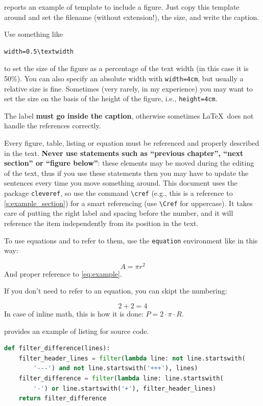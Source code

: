  reports an example of template to include a figure.
Just copy this template around and set the filename (without extension!), the size, and write the caption.

Use something like

\begin{verbatim}
width=0.5\textwidth
\end{verbatim}

to set the size of the figure as a percentage of the text width (in this case it is 50\%).
You can also specify an absolute width with \texttt{width=4cm}, but usually a relative size is fine.
Sometimes (very rarely, in my experience) you may want to set the size on the basis of the height of the figure, i.e., \texttt{height=4cm}.

The label \textbf{must go inside the caption}, otherwise sometimes \LaTeX\ does not handle the references correctly.

Every figure, table, listing or equation must be referenced and properly described in the text.
\textbf{Never use statements such as \enquote{previous chapter}, \enquote{next section} or \enquote{figure below}}: these elements may be moved during the editing of the text, thus if you use these statements then you may have to update the sentences every time you move something around.
This document uses the package \texttt{cleveref}, so use the command \texttt{\textbackslash cref} (e.g., this is a reference to \cref{s:example_section}) for a smart referencing (use \texttt{\textbackslash Cref} for uppercase).
It takes care of putting the right label and spacing before the number, and it will reference the item independently from its position in the text.

To use equations and to refer to them, use the \texttt{equation} environment like in this way:

\begin{equation}
\label{eq:example}
A = \pi r^2
\end{equation}
%
And proper reference to \cref{eq:example}.

If you don't need to refer to an equation, you can skipt the numbering:

\[
2 + 2 = 4
\]
%
In case of inline math, this is how it is done: $P = 2 \cdot \pi \cdot R$.

 provides an example of listing for source code.

\begin{lstlisting}[language=Python,
caption={Example of listing.},
label={lst:example-listing},
float=tp]
def filter_difference(lines):
    filter_header_lines = filter(lambda line: not line.startswith(
        '---') and not line.startswith('+++'), lines)
    filter_difference = filter(lambda line: line.startswith(
        '-') or line.startswith('+'), filter_header_lines)
    return filter_difference
\end{lstlisting}



